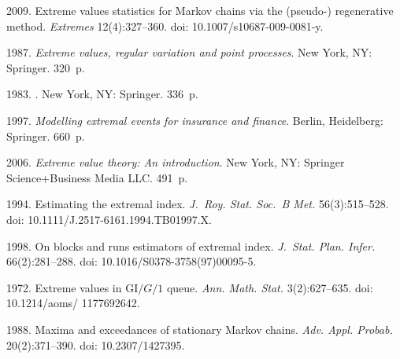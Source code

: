 \vspace*{3pt}

  \begin{multicols}{2}

\renewcommand{\bibname}{\protect\rmfamily References}

{\small\frenchspacing
 {%
 \begin{thebibliography}{99}

 2009.
Extreme values statistics for Markov chains via the \mbox{(pseudo-)} 
regenerative method. \textit{Extremes} 12(4):327--360. doi: 10.1007/s10687-009-0081-y.

 1987.
\textit{Extreme values, regular variation and point processes}. 
New York, NY: Springer. 320~p. 

 1983. 
. New York, NY: Springer. 336~p.

 1997. \textit{Modelling extremal events for insurance and finance}. Berlin, Heidelberg:   Springer. 660~p.

 2006.  \textit{Extreme value theory:  An introduction}.
New York, NY:  Springer Science\;+\;Business Media LLC. 491~p.



 1994.
Estimating the extremal index. \textit{J.~Roy. Stat. Soc.~B Met.} 56(3):515--528.
doi: 10.1111/J.2517-6161.1994.TB01997.X.

 1998.
On blocks and runs estimators of extremal index.
\textit{J.~Stat. Plan. Infer.}  66(2):281--288. doi: 10.1016/S0378-3758(97)00095-5.


 1972. 
Extreme values in $\mathrm{GI}/G/1$ queue. \textit{Ann. Math. Stat.} 3(2):627--635. doi: 10.1214/aoms/ 1177692642.


 1988.
Maxima and exceedances of stationary Markov chains.
\textit{Adv. Appl. Probab.} 20(2):371--390. doi: 10.2307/1427395.



\end{thebibliography}}}
\end{multicols}
